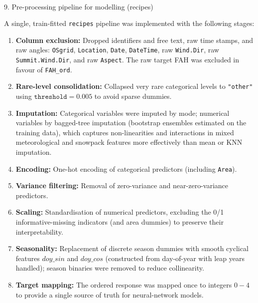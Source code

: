 \documentclass[
  letterpaper,
  DIV=11,
  numbers=noendperiod]{scrartcl}
\makeatletter
\let\oldparagraph\paragraph
\renewcommand{\paragraph}{
    \@ifstar
      \xxxParagraphStar
      \xxxParagraphNoStar
  }
\newcommand{\xxxParagraphStar}[1]{\oldparagraph*{#1}\mbox{}}
\newcommand{\xxxParagraphNoStar}[1]{\oldparagraph{#1}\mbox{}}
\providecommand{\tightlist}{%
  \setlength{\itemsep}{0pt}\setlength{\parskip}{0pt}}\usepackage{longtable,booktabs,array}
\makeatother
\begin{document}
\paragraph{9. Pre-processing pipeline for modelling
(recipes)}\label{pre-processing-pipeline-for-modelling-recipes}

A single, train-fitted \texttt{recipes} pipeline was implemented with
the following stages:

\begin{enumerate}
\def\labelenumi{\arabic{enumi}.}
\tightlist
\item
  \textbf{Column exclusion:} Dropped identifiers and free text, raw time
  stamps, and raw angles: \texttt{OSgrid}, \texttt{Location},
  \texttt{Date}, \texttt{DateTime}, raw \texttt{Wind.Dir}, raw
  \texttt{Summit.Wind.Dir}, and raw \texttt{Aspect}. The raw target FAH
  was excluded in favour of \texttt{FAH\_ord}.\\
\item
  \textbf{Rare-level consolidation:} Collapsed very rare categorical
  levels to \texttt{"other"} using \(\texttt{threshold} = 0.005\) to
  avoid sparse dummies.\\
\item
  \textbf{Imputation:} Categorical variables were imputed by mode;
  numerical variables by bagged-tree imputation (bootstrap ensembles
  estimated on the training data), which captures non-linearities and
  interactions in mixed meteorological and snowpack features more
  effectively than mean or KNN imputation.\\
\item
  \textbf{Encoding:} One-hot encoding of categorical predictors
  (including \texttt{Area}).\\
\item
  \textbf{Variance filtering:} Removal of zero-variance and
  near-zero-variance predictors.\\
\item
  \textbf{Scaling:} Standardisation of numerical predictors, excluding
  the 0/1 informative-missing indicators (and area dummies) to preserve
  their interpretability.\\
\item
  \textbf{Seasonality:} Replacement of discrete season dummies with
  smooth cyclical features \(doy\_sin\) and \(doy\_cos\) (constructed
  from day-of-year with leap years handled); season binaries were
  removed to reduce collinearity.\\
\item
  \textbf{Target mapping:} The ordered response was mapped once to
  integers \(0{-}4\) to provide a single source of truth for
  neural-network models.
\end{enumerate}
\end{document}
